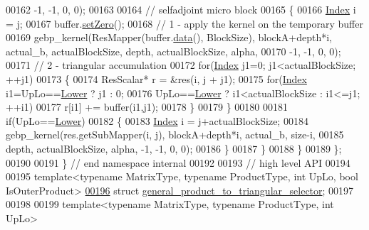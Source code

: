 \begin{DoxyCode}
00162                     -1, -1, 0, 0);
00163 
00164       \textcolor{comment}{// selfadjoint micro block}
00165       \{
00166         \hyperlink{namespace_eigen_a62e77e0933482dafde8fe197d9a2cfde}{Index} i = j;
00167         buffer.\hyperlink{class_eigen_1_1_plain_object_base_ac21ad5f989f320e46958b75ac8d9a1da}{setZero}();
00168         \textcolor{comment}{// 1 - apply the kernel on the temporary buffer}
00169         gebp\_kernel(ResMapper(buffer.\hyperlink{class_eigen_1_1_plain_object_base_ac25699535374b1854cf8494e44ad31b2}{data}(), BlockSize), blockA+depth*i, actual\_b, actualBlockSize, 
      depth, actualBlockSize, alpha,
00170                     -1, -1, 0, 0);
00171         \textcolor{comment}{// 2 - triangular accumulation}
00172         \textcolor{keywordflow}{for}(\hyperlink{namespace_eigen_a62e77e0933482dafde8fe197d9a2cfde}{Index} j1=0; j1<actualBlockSize; ++j1)
00173         \{
00174           ResScalar* r = &res(i, j + j1);
00175           \textcolor{keywordflow}{for}(\hyperlink{namespace_eigen_a62e77e0933482dafde8fe197d9a2cfde}{Index} i1=UpLo==\hyperlink{group__enums_gga39e3366ff5554d731e7dc8bb642f83cda891792b8ed394f7607ab16dd716f60e6}{Lower} ? j1 : 0;
00176               UpLo==\hyperlink{group__enums_gga39e3366ff5554d731e7dc8bb642f83cda891792b8ed394f7607ab16dd716f60e6}{Lower} ? i1<actualBlockSize : i1<=j1; ++i1)
00177             r[i1] += buffer(i1,j1);
00178         \}
00179       \}
00180 
00181       \textcolor{keywordflow}{if}(UpLo==\hyperlink{group__enums_gga39e3366ff5554d731e7dc8bb642f83cda891792b8ed394f7607ab16dd716f60e6}{Lower})
00182       \{
00183         \hyperlink{namespace_eigen_a62e77e0933482dafde8fe197d9a2cfde}{Index} i = j+actualBlockSize;
00184         gebp\_kernel(res.getSubMapper(i, j), blockA+depth*i, actual\_b, size-i, 
00185                     depth, actualBlockSize, alpha, -1, -1, 0, 0);
00186       \}
00187     \}
00188   \}
00189 \};
00190 
00191 \} \textcolor{comment}{// end namespace internal}
00192 
00193 \textcolor{comment}{// high level API}
00194 
00195 \textcolor{keyword}{template}<\textcolor{keyword}{typename} MatrixType, \textcolor{keyword}{typename} ProductType, \textcolor{keywordtype}{int} UpLo, \textcolor{keywordtype}{bool} IsOuterProduct>
\hyperlink{struct_eigen_1_1general__product__to__triangular__selector}{00196} \textcolor{keyword}{struct }\hyperlink{struct_eigen_1_1general__product__to__triangular__selector}{general\_product\_to\_triangular\_selector};
00197 
00198 
00199 \textcolor{keyword}{template}<\textcolor{keyword}{typename} MatrixType, \textcolor{keyword}{typename} ProductType, \textcolor{keywordtype}{int} UpLo>

\end{DoxyCode}
